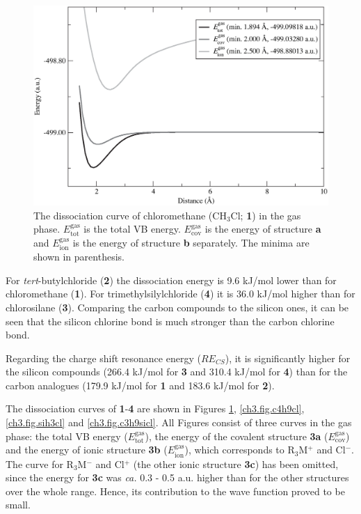 \begin{figure}[hbtp]
\begin{center}
\includegraphics[scale=0.55]{dissociation/figures/ch3cl_g.eps}
\end{center}
\caption{The dissociation curve of chloromethane (CH$_3$Cl; \textbf{1}) in the gas phase. $E_\mathrm{tot}^\mathrm{gas}$ is the total VB energy. $E_\mathrm{cov}^\mathrm{gas}$ is the energy of structure \textbf{a} and $E_\mathrm{ion}^\mathrm{gas}$ is the energy of structure \textbf{b} separately. The minima are shown in parenthesis.}
\label{ch3.fig.ch3cl}
\end{figure}

For \textit{tert}-butylchloride (\textbf{2}) the dissociation energy is 9.6 kJ/mol lower than for chloromethane (\textbf{1}). For trimethylsilylchloride (\textbf{4}) it is 36.0 kJ/mol higher than for chlorosilane (\textbf{3}). Comparing the carbon compounds to the silicon ones, it can be seen that the silicon chlorine bond is much stronger than the carbon chlorine bond.

Regarding the charge shift resonance energy ($RE_{CS}$), it is significantly higher for the silicon compounds (266.4 kJ/mol for \textbf{3} and 310.4 kJ/mol for \textbf{4}) than for the carbon analogues (179.9 kJ/mol for \textbf{1} and 183.6 kJ/mol for \textbf{2}).

The dissociation curves of \textbf{1}-\textbf{4} are shown in Figures \ref{ch3.fig.ch3cl}, \ref{ch3.fig.c4h9cl}, \ref{ch3.fig.sih3cl} and \ref{ch3.fig.c3h9sicl}. All Figures consist of three curves in the gas phase: the total VB energy ($E_\mathrm{tot}^\mathrm{gas}$), the energy of the covalent structure \textbf{3a} ($E_\mathrm{cov}^\mathrm{gas}$) and the energy of ionic structure \textbf{3b} ($E_\mathrm{ion}^\mathrm{gas}$), which corresponds to R$_3$M$^{+}$ and Cl$^{-}$. The curve for R$_3$M$^{-}$ and Cl$^{+}$ (the other ionic structure \textbf{3c}) has been omitted, since the energy for \textbf{3c} was \textit{ca.} 0.3 - 0.5 a.u. higher than for the other structures over the whole range. Hence, its contribution to the wave function proved to be small.

